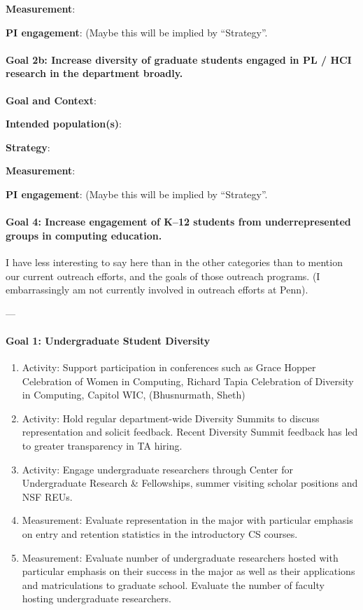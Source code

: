 \textbf{Measurement}:

\textbf{PI engagement}: (Maybe this will be implied by ``Strategy''.

\paragraph*{Goal 2b: Increase diversity of graduate students engaged in PL / HCI
research in the department broadly.}

\textbf{Goal and Context}:

\textbf{Intended population(s)}:

\textbf{Strategy}:

\textbf{Measurement}:

\textbf{PI engagement}: (Maybe this will be implied by ``Strategy''.

\paragraph*{Goal 4: Increase engagement of K--12 students from underrepresented
groups in computing education.}

I have less interesting to say here than in the other categories than to mention
our current outreach efforts, and the goals of those outreach programs. (I
embarrassingly am not currently involved in outreach efforts at Penn).

---

\paragraph*{Goal 1: Undergraduate Student Diversity}

\begin{enumerate}
\item Activity: Support participation in conferences such as Grace Hopper Celebration of Women in Computing, Richard Tapia Celebration of Diversity in Computing, Capitol WIC, (Bhusnurmath, Sheth)
\item Activity: Hold regular department-wide Diversity Summits to discuss representation and solicit feedback. Recent Diversity Summit feedback has led to greater transparency in TA hiring.
\item Activity: Engage undergraduate researchers through Center for Undergraduate Research \& Fellowships, summer visiting scholar positions and NSF REUs.
\item Measurement: Evaluate representation in the major with particular emphasis on entry and retention statistics in the introductory CS courses.
\item Measurement: Evaluate number of undergraduate researchers hosted with particular emphasis on their success in the major as well as their applications and matriculations to graduate school. Evaluate the number of faculty hosting undergraduate researchers.
\end{enumerate}


